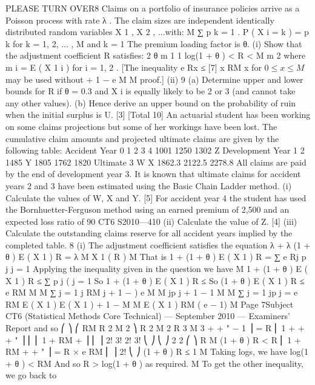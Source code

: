 \documentclass[a4paper,12pt]{article}
\begin{document}
\begin{enumerate}
PLEASE TURN OVER8
Claims on a portfolio of insurance policies arrive as a Poisson process with rate λ .
The claim sizes are independent identically distributed random variables
X 1 , X 2 , ...with:
M
∑ p k = 1 .
P ( X i = k ) = p k for k = 1, 2, ... , M and
k = 1
The premium loading factor is θ.
(i)
Show that the adjustment coefficient R satisfies:
2 θ m 1
1
log(1 + θ ) < R <
M
m 2
where m i = E ( X 1 i ) for i = 1, 2 .
[The inequality e Rx ≤
[7]
x RM
x
for $0 \leq x \leq M$ may be used without
+ 1 −
e
M
M
proof.]
(ii)
9
(a) Determine upper and lower bounds for R if θ = 0.3 and X i is equally likely to be 2 or 3 (and cannot take any other values).
(b) Hence derive an upper bound on the probability of ruin when the initial surplus is U.
[3]
[Total 10]
An actuarial student has been working on some claims projections but some of her workings have been lost. The cumulative claim amounts and projected ultimate claims are given by the following table:
Accident
Year 0
1
2
3
4 1001
1250
1302
Z
Development Year
1
2
1485
Y
1805
1762
1820
Ultimate
3
W
X
1862.3
2122.5
2278.8
All claims are paid by the end of development year 3.
It is known that ultimate claims for accident years 2 and 3 have been estimated using
the Basic Chain Ladder method.
(i)
Calculate the values of W, X and Y.
[5]
For accident year 4 the student has used the Bornhuetter-Ferguson method using an
earned premium of 2,500 and an expected loss ratio of 90%
CT6 S2010—410
(ii) Calculate the value of Z.
[4]
(iii) Calculate the outstanding claims reserve for all accident years implied by the
completed table.
8
(i)
The adjustment coefficient satisfies the equation
λ + λ (1 + θ ) E ( X 1 ) R = λ M X 1 ( R )
M
That is 1 + (1 + θ ) E ( X 1 ) R = ∑ e Rj p j
j = 1
Applying the inequality given in the question we have
M
1 + (1 + θ ) E ( X 1 ) R ≤ ∑ p j (
j = 1
So 1 + (1 + θ ) E ( X 1 ) R ≤
So (1 + θ ) E ( X 1 ) R ≤
e RM
M
M
∑
j = 1
j RM
j
+ 1 − )
e
M
M
jp j + 1 −
1
M
M
∑
j = 1
jp j =
e RM E ( X 1 )
E ( X 1 )
+ 1 −
M
M
E ( X 1 ) RM
( e
− 1)
M
Page 7Subject CT6 (Statistical Methods Core Technical) — September 2010 — Examiners’ Report
and so
⎛
⎞
⎛ RM R 2 M 2
⎞
R 2 M 2 R 3 M 3
+
+ " − 1 ⎟ = R ⎜ 1 +
+
+ " ⎟
⎜ ⎜ 1 + RM +
⎟
⎜
⎟
2!
3!
2!
3!
⎝
⎠
⎝
⎠
2
2
⎛
⎞
R M
(1 + θ ) R < R ⎜ 1 + RM +
+ " ⎟ = R × e RM
⎜
⎟
2!
⎝
⎠
(1 + θ ) R ≤
1
M
Taking logs, we have
log(1 + θ ) < RM
And so R >
log(1 + θ )
as required.
M
To get the other inequality, we go back to

\end{enumerate}
\end{document}
